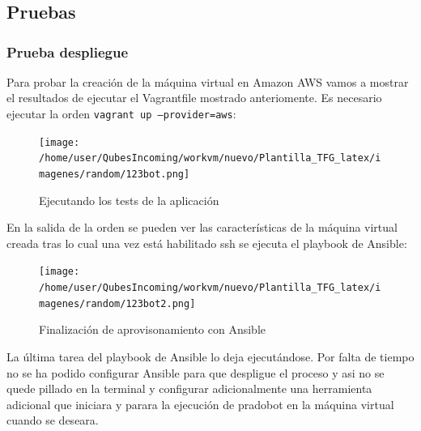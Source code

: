 \chapter{}

\section{Pruebas}

\subsection{Prueba despliegue}

Para probar la creación de la máquina virtual en Amazon AWS vamos a mostrar el resultados de ejecutar el Vagrantfile mostrado anteriomente. Es necesario ejecutar la orden \texttt{vagrant up --provider=aws}:
\begin{figure}[H] %
\centering
\texttt{[image: /home/user/QubesIncoming/workvm/nuevo/Plantilla\_TFG\_latex/imagenes/random/123bot.png]}  %

\caption{Ejecutando los tests de la aplicación}\label{figura92}

\end{figure}

En la salida de la orden se pueden ver las características de la máquina virtual creada tras lo cual una vez está habilitado ssh se ejecuta el playbook de Ansible:

\begin{figure}[H] %
\centering
\texttt{[image: /home/user/QubesIncoming/workvm/nuevo/Plantilla\_TFG\_latex/imagenes/random/123bot2.png]}  %

\caption{Finalización de aprovisonamiento con Ansible}\label{figura94}

\end{figure}

La última tarea del playbook de Ansible lo deja ejecutándose. Por falta de tiempo no se ha podido configurar Ansible para que despligue el proceso y asi no se quede pillado en la terminal y configurar adicionalmente una herramienta adicional que iniciara y parara la ejecución de pradobot en la máquina virtual cuando se deseara.



